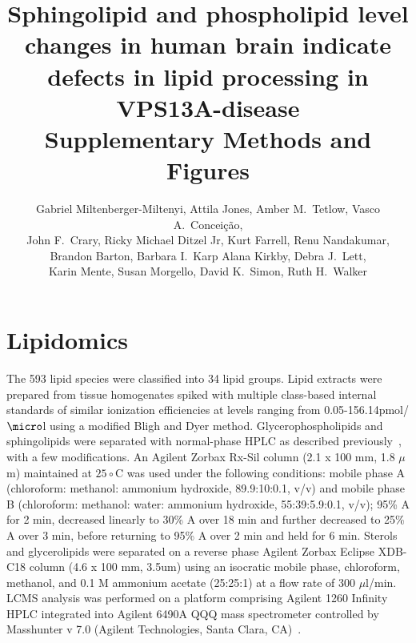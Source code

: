 \documentclass[letterpaper]{article}
\begin{document}
\title{Sphingolipid and phospholipid level changes in human brain indicate
defects in lipid processing in VPS13A-disease
	\\
{\large Supplementary Methods and Figures}}

\author{Gabriel Miltenberger-Miltenyi, Attila Jones, Amber M.~Tetlow,  Vasco A.~Conceição, 
\\
	John F.~Crary, Ricky Michael Ditzel Jr, Kurt Farrell, Renu Nandakumar,
\\
	Brandon Barton, Barbara I.~Karp  Alana Kirkby, Debra J.~Lett,
\\
	Karin Mente, Susan Morgello, David K.~Simon, Ruth H.~Walker}
\date{}
\maketitle

\renewcommand{\contentsname}{Supplementary Methods}
\tableofcontents
\renewcommand*\listfigurename{Supplementary Figures}
\listoffigures

\setcounter{table}{4}
\makeatletter 
\renewcommand{\tablename}{Supplementary Table S} %
\makeatother

\section{Lipidomics}

The 593 lipid species were classified into 34 lipid groups.  Lipid extracts
were prepared from tissue homogenates spiked with multiple class-based
internal standards of similar ionization efficiencies at levels ranging from
0.05-156.14pmol/$\micro$l using a modified Bligh and Dyer method.
Glycerophospholipids and sphingolipids were separated with normal-phase HPLC
as described previously~\citep{CHAN20122678}, with a few modifications. An
Agilent Zorbax Rx-Sil column (2.1 x 100 mm, 1.8 $\mu$m) maintained at
$25\circ$C was used under the following conditions: mobile phase A
(chloroform: methanol: ammonium hydroxide, 89.9:10:0.1, v/v) and mobile phase
B (chloroform: methanol: water: ammonium hydroxide, 55:39:5.9:0.1, v/v); 95\%
A for 2 min, decreased linearly to 30\% A over 18 min and further decreased to
25\% A over 3 min, before returning to 95\% A over 2 min and held for 6 min.
Sterols and glycerolipids were separated on a reverse phase
Agilent Zorbax Eclipse XDB-C18 column (4.6 x 100 mm, 3.5um) using an isocratic
mobile phase, chloroform, methanol, and 0.1 M ammonium acetate (25:25:1) at a
flow rate of 300 $\mu$l/min. LCMS analysis was performed on a platform
comprising Agilent 1260 Infinity HPLC integrated into Agilent 6490A QQQ mass
spectrometer controlled by Masshunter v 7.0 (Agilent Technologies, Santa
Clara, CA)~\citep{Chan2017}.
\end{document}
